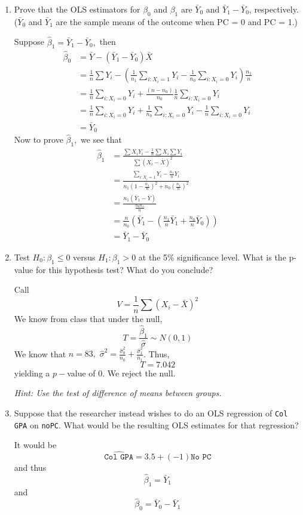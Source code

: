 \documentclass[11pt]{article}
\begin{document}
\begin{enumerate}[label=(\alph*)]
    \item Prove that the OLS estimators for \( \beta_0 \) and \( \beta_1 \) are \( \bar{Y}_0 \) and \( \bar{Y}_1 - \bar{Y}_0 \), respectively. (\( \bar{Y}_0 \) and \( \bar{Y}_1 \) are the sample means of the outcome when PC = 0 and PC = 1.)
\begin{solution}
    Suppose $\hat\beta_1 = \bar Y_1 - \bar Y_0,$ then 
    \begin{align*}
    \hat\beta_0 &= \bar Y - (\bar Y_1 - \bar Y_0)\bar X\\
    &= \frac{1}{n}\sum Y_i - (\frac{1}{n_1}\sum_{i: X_i = 1}Y_i - \frac{1}{n_0}\sum_{i: X_i = 0}Y_i)\frac{n_1}{n}    \\
    &= \frac{1}{n} \sum_{i: X_i = 0} Y_i+ \frac{(n-n_0)}{n_0} \frac{1}{n}\sum_{i: X_i = 0}Y_i\\
    &= \frac{1}{n}\sum_{i: X_i = 0} Y_i + \frac{1}{n_0}\sum_{i: X_i = 0} Y_i - \frac{1}{n}\sum_{i: X_i = 0} Y_i\\
    &= \bar Y_0
    \end{align*}
    Now to prove $\hat\beta_1,$ we see that 
    \begin{align*}
\hat{\beta}_1 &= \frac{\sum X_iY_i - \frac{1}{n}\sum X_i \sum Y_i}{\sum (X_i - \bar X)^2}\\
&= \frac{\sum_{i: X_i = 1} Y_i - \frac{n_1}{n} Y_i}{n_1(1 - \frac{n_1}{n})^2 + n_0(\frac{n_1}{n})^2}\\
&= \frac{n_1\left(\bar Y_1 - \bar Y\right)}{\frac{n_0n_1}{n}}\\
&= \frac{n}{n_0}(\bar Y_1 - (\frac{n_1}{n}\bar Y_1 + \frac{n_0}{n}\bar Y_0))\\
&= \bar Y_1 - \bar Y_0
    \end{align*}
    
\end{solution}
    \item Test \( H_0 : \beta_1 \leq 0 \) versus \( H_1 : \beta_1 > 0 \) at the 5\% significance level. What is the p-value for this hypothesis test? What do you conclude? \\
\begin{solution}
Call 
\[V = \frac{1}{n}\sum (X_i - \bar X)^2\]
    We know from class that under the null,
    \[T = \frac{\hat{\beta}_1}{\hat{\sigma}} \sim N(0,1)\] We know that $n = 83,$ $\hat{\sigma}^2 = \frac{\hat\sigma_0^2}{n_0} + \frac{\hat{\sigma}_1^2 }{n_1}$. Thus, 
    \[T = 7.042\] yielding a $p-$value of $0.$ We reject the null. 
\end{solution}
    \textit{Hint: Use the test of difference of means between groups.}
    \item Suppose that the researcher instead wishes to do an OLS regression of \texttt{Col GPA} on \texttt{noPC}. What would be the resulting OLS estimates for that regression?
    \begin{solution}
        It would be 
        \[\hat{\texttt{Col GPA}} = 3.5 + (-1)\texttt{No PC}\] and thus 
        \[\hat\beta_1 = \bar Y_1\] and \[\hat\beta_0 = \bar Y_0 - \bar Y_1\]
    \end{solution}
\end{enumerate}
\end{document}
